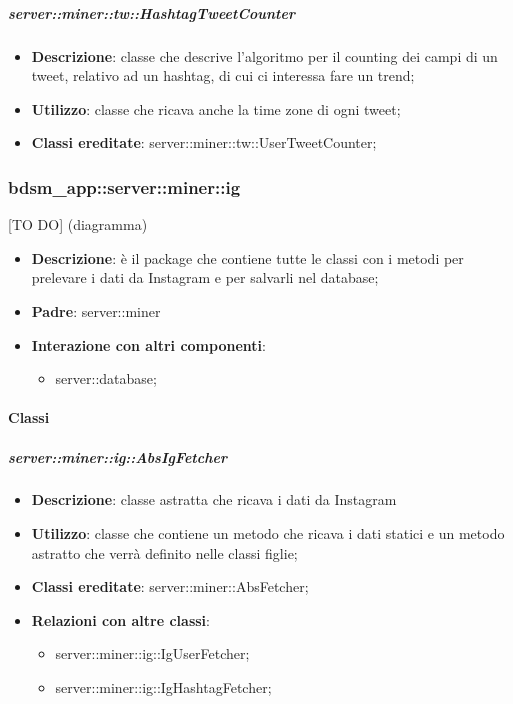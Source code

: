 		
	\subparagraph{server::miner::tw::HashtagTweetCounter} %
		\label{subp:server_miner_tw_HashtagTweetCounter}
			\begin{itemize}
				\item \textbf{Descrizione}: classe che descrive l'algoritmo per il counting dei campi di un tweet, relativo ad un hashtag, di cui ci interessa fare un trend;
				\item \textbf{Utilizzo}: classe che ricava anche la time zone di ogni tweet;
				\item \textbf{Classi ereditate}: server::miner::tw::UserTweetCounter;
			\end{itemize}

\subsubsection{bdsm\_app::server::miner::ig} %
\label{ssub:bdsm_app_server_miner_ig}
[TO DO] (diagramma) \newline \newline

\begin{itemize}
  \item \textbf{Descrizione}: è il package che contiene tutte le classi con i metodi per prelevare i dati da Instagram e per salvarli nel database;
  \item \textbf{Padre}: server::miner
   \item \textbf{Interazione con altri componenti}:
  	\begin{itemize}
  		\item server::database;
  	\end{itemize}
\end{itemize}	

	\paragraph{Classi} %
	\subparagraph{server::miner::ig::AbsIgFetcher} %
		\label{subp:server_miner_ig_AbsIgFetcher}
			\begin{itemize}
				\item \textbf{Descrizione}: classe astratta che ricava i dati da Instagram
				\item \textbf{Utilizzo}: classe che contiene un metodo che ricava i dati statici e un metodo astratto che verrà definito nelle classi figlie;
				\item \textbf{Classi ereditate}: server::miner::AbsFetcher;				
				\item \textbf{Relazioni con altre classi}:
					\begin{itemize}
						\item server::miner::ig::IgUserFetcher;
						\item server::miner::ig::IgHashtagFetcher;
					\end{itemize}
			\end{itemize}

